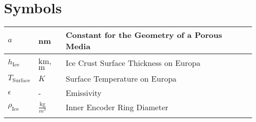 \chapter*{Symbols}

\begin{longtable}[c]{lll}
  $a$                      & nm                                          & Constant for the Geometry of a Porous Media   \\
\endfirsthead
%
\endhead
%


$h_\text{Ice}$           & $\text{km}$,$\text{m}$                      & Ice Crust Surface Thickness on Europa         \\
$T_\text{Surface}$       & $K$                                         & Surface Temperature on Europa                 \\
$\epsilon$               & -                                           & Emissivity                                    \\
$\rho_\text{Ice}$       & $\frac{\text{kg}}{m^3}$                      & Inner Encoder Ring Diameter                   \\
   

\label{tab:my-table}\\
\end{longtable}




